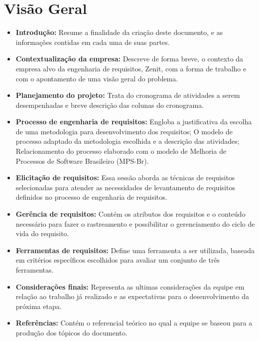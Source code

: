 \section{Visão Geral}
\begin{itemize}
\item \textbf{Introdução:} 
Resume a finalidade da criação deste documento, e as informações contidas em cada uma de suas partes.
\item \textbf{Contextualização da empresa:} 
Descreve de forma breve, o contexto da empresa alvo da engenharia de requisitos, Zenit, com a forma de trabalho e com o apontamento de uma visão geral do problema.
\item \textbf{Planejamento do projeto:} 
Trata do cronograma de atividades a serem desempenhadas e breve descrição das colunas do cronograma.
\item \textbf{Processo de engenharia de requisitos:} 
Engloba a justificativa da escolha de uma metodologia para desenvolvimento dos requisitos; O modelo de processo adaptado da metodologia escolhida e a descrição das atividades; Relacionamento do processo elaborado com o modelo de Melhoria de Processos de Software Brasileiro (MPS-Br).
\item \textbf{Elicitação de requisitos:} 
Essa sessão aborda as técnicas de requisitos selecionadas para atender as necessidades de levantamento de requisitos definidos no processo de engenharia de requisitos.
\item \textbf{Gerência de requisitos:} 
Contém os atributos dos requisitos e o conteúdo necessário para fazer o rastreamento e possibilitar o gerenciamento do ciclo de vida do requisito.
\item \textbf{Ferramentas de requisitos:} 
Define uma ferramenta a ser utilizada, baseada em critérios específicos escolhidos para avaliar um conjunto de três ferramentas.
\item \textbf{Considerações finais:} 
Representa as ultimas considerações da equipe em relação ao trabalho já realizado e as expectativas para o desenvolvimento da próxima etapa.
\item \textbf{Referências:} 
Contém o referencial teórico no qual a equipe se baseou para a produção dos tópicos do documento.
\end{itemize}
